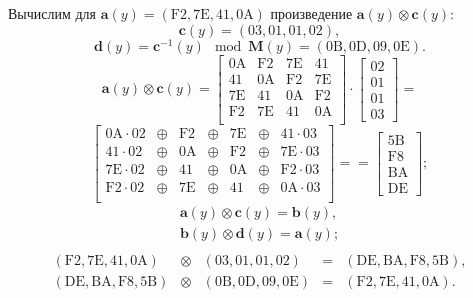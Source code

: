 \example
Вычислим для $\mathbf{a}(y) = (\mathrm{F2}, \mathrm{7E}, \mathrm{41}, \mathrm{0A})$ произведение $\mathbf{a}(y) \otimes \mathbf{c}(y)$:
\[
    \mathbf{c}(y) = (03, 01, 01, 02),
\] \[
    \mathbf{d}(y) = \mathbf{c}^{-1}(y) \mod \mathbf{M}(y) = (\mathrm{0B}, \mathrm{0D}, \mathrm{09}, \mathrm{0E}).
\] \[
    \mathbf{a}(y) \otimes \mathbf{c}(y) =
    \left[ \begin{array}{cccc}
        \mathrm{0A} & \mathrm{F2} & \mathrm{7E} & \mathrm{41} \\
        \mathrm{41} & \mathrm{0A} & \mathrm{F2} & \mathrm{7E} \\
        \mathrm{7E} & \mathrm{41} & \mathrm{0A} & \mathrm{F2} \\
        \mathrm{F2} & \mathrm{7E} & \mathrm{41} & \mathrm{0A} \\
    \end{array} \right] \cdot
    \left[ \begin{array}{c} \mathrm{02} \\ \mathrm{01} \\ \mathrm{01} \\ \mathrm{03} \end{array} \right] =
\] \[
    \left[ \begin{array}{ccccccc}
        \mathrm{0A} \cdot \mathrm{02} & \oplus & \mathrm{F2} & \oplus & \mathrm{7E} & \oplus & \mathrm{41} \cdot \mathrm{03} \\
        \mathrm{41} \cdot \mathrm{02} & \oplus & \mathrm{0A} & \oplus & \mathrm{F2} & \oplus & \mathrm{7E} \cdot \mathrm{03} \\
        \mathrm{7E} \cdot \mathrm{02} & \oplus & \mathrm{41} & \oplus & \mathrm{0A} & \oplus & \mathrm{F2} \cdot \mathrm{03} \\
        \mathrm{F2} \cdot \mathrm{02} & \oplus & \mathrm{7E} & \oplus & \mathrm{41} & \oplus & \mathrm{0A} \cdot \mathrm{03} \\
    \end{array} \right] =
    =\left[ \begin{array}{c} \mathrm{5B} \\ \mathrm{F8} \\ \mathrm{BA} \\ \mathrm{DE} \end{array} \right];
\] \[
    \begin{array}{l}
        \mathbf{a}(y) \otimes \mathbf{c}(y) = \mathbf{b}(y), \\
        \mathbf{b}(y) \otimes \mathbf{d}(y) = \mathbf{a}(y); \\
    \end{array}
\] \[
    \begin{array}{ccccc}
        (\mathrm{F2}, \mathrm{7E}, \mathrm{41}, \mathrm{0A}) & \otimes & (\mathrm{03}, \mathrm{01}, \mathrm{01}, \mathrm{02}) & = & (\mathrm{DE}, \mathrm{BA}, \mathrm{F8}, \mathrm{5B}), \\
        (\mathrm{DE}, \mathrm{BA}, \mathrm{F8}, \mathrm{5B}) & \otimes & (\mathrm{0B}, \mathrm{0D}, \mathrm{09}, \mathrm{0E}) & = & (\mathrm{F2}, \mathrm{7E}, \mathrm{41}, \mathrm{0A}). \\
    \end{array}
\]
\exampleend
